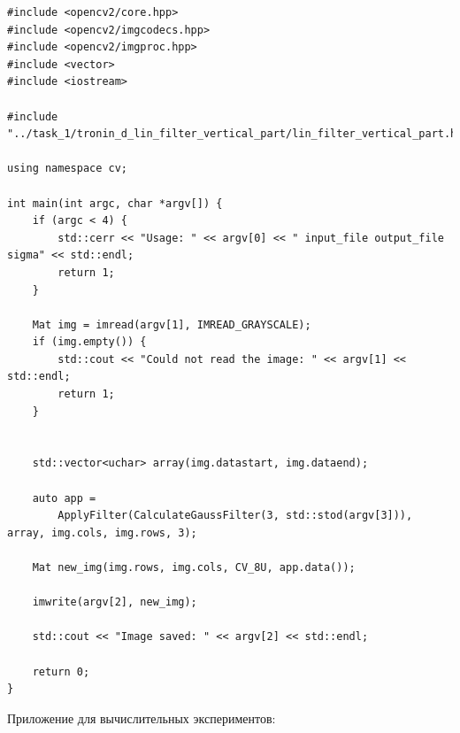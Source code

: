 \documentclass{report}
\begin{document}
\begin{lstlisting}
#include <opencv2/core.hpp>
#include <opencv2/imgcodecs.hpp>
#include <opencv2/imgproc.hpp>
#include <vector>
#include <iostream>

#include "../task_1/tronin_d_lin_filter_vertical_part/lin_filter_vertical_part.h"

using namespace cv;

int main(int argc, char *argv[]) {
    if (argc < 4) {
        std::cerr << "Usage: " << argv[0] << " input_file output_file sigma" << std::endl;
        return 1;
    }

    Mat img = imread(argv[1], IMREAD_GRAYSCALE);
    if (img.empty()) {
        std::cout << "Could not read the image: " << argv[1] << std::endl;
        return 1;
    }


    std::vector<uchar> array(img.datastart, img.dataend);

    auto app =
        ApplyFilter(CalculateGaussFilter(3, std::stod(argv[3])), array, img.cols, img.rows, 3);

    Mat new_img(img.rows, img.cols, CV_8U, app.data());

    imwrite(argv[2], new_img);

    std::cout << "Image saved: " << argv[2] << std::endl;

    return 0;
}
\end{lstlisting}

Приложение для вычислительных экспериментов:
\end{document}
